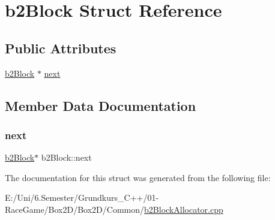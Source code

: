 \hypertarget{structb2_block}{}\section{b2\+Block Struct Reference}
\label{structb2_block}
\subsection*{Public Attributes}
\begin{DoxyCompactItemize}
\item 
\mbox{\hyperlink{structb2_block}{b2\+Block}} $\ast$ \mbox{\hyperlink{structb2_block_a4b410d4fd7ad2a117c70776f60cb2738}{next}}
\end{DoxyCompactItemize}


\subsection{Member Data Documentation}
\mbox{\label{structb2_block_a4b410d4fd7ad2a117c70776f60cb2738}} 
\subsubsection{\texorpdfstring{next}{next}}
{\footnotesize\ttfamily \mbox{\hyperlink{structb2_block}{b2\+Block}}$\ast$ b2\+Block\+::next}



The documentation for this struct was generated from the following file\+:\begin{DoxyCompactItemize}
\item 
E\+:/\+Uni/6.\+Semester/\+Grundkurs\+\_\+\+C++/01-\/\+Race\+Game/\+Box2\+D/\+Box2\+D/\+Common/\mbox{\hyperlink{b2_block_allocator_8cpp}{b2\+Block\+Allocator.\+cpp}}\end{DoxyCompactItemize}
